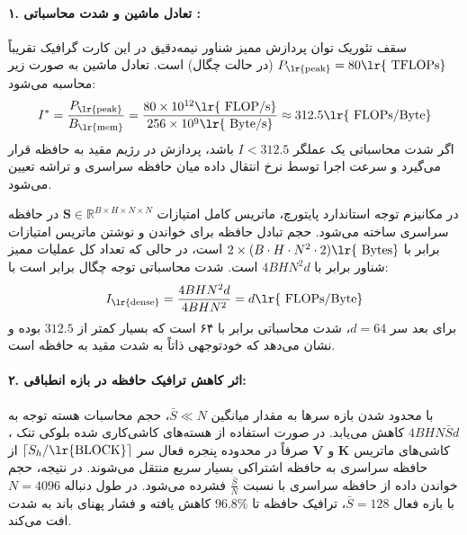\paragraph{۱. تعادل ماشین و شدت محاسباتی :}
سقف تئوریک توان پردازش ممیز شناور نیمه‌دقیق  در این کارت گرافیک تقریباً $P_{\text{\lr{peak}}} = 80\text{\lr{ TFLOPs}}$ (در حالت چگال) است. تعادل ماشین  به صورت زیر محاسبه می‌شود:
\begin{equation}
I^* = \frac{P_{\text{\lr{peak}}}}{B_{\text{\lr{mem}}}} = \frac{80 \times 10^{12}\text{\lr{ FLOP/s}}}{256 \times 10^9\text{\lr{ Byte/s}}} \approx 312.5\text{\lr{ FLOPs/Byte}}
\end{equation}
اگر شدت محاسباتی یک عملگر $I < 312.5$ باشد، پردازش در رژیم مقید به حافظه  قرار می‌گیرد و سرعت اجرا توسط نرخ انتقال داده میان حافظه سراسری  و تراشه تعیین می‌شود.

در مکانیزم توجه استاندارد پایتورچ، ماتریس کامل امتیازات $\mathbf{S} \in \mathbb{R}^{B \times H \times N \times N}$ در حافظه سراسری ساخته می‌شود. حجم تبادل حافظه برای خواندن و نوشتن ماتریس امتیازات برابر با $2 \times (B \cdot H \cdot N^2 \cdot 2)\text{\lr{ Bytes}}$ است، در حالی که تعداد کل عملیات ممیز شناور برابر با $4 B H N^2 d$ است. شدت محاسباتی توجه چگال برابر است با:
\begin{equation}
I_{\text{\lr{dense}}} = \frac{4 B H N^2 d}{4 B H N^2} = d\text{\lr{ FLOPs/Byte}}
\end{equation}
برای بعد سر $d = 64$، شدت محاسباتی برابر با ۶۴ است که بسیار کمتر از $312.5$ بوده و نشان می‌دهد که خودتوجهی ذاتاً به شدت مقید به حافظه است.

\paragraph{۲. اثر کاهش ترافیک حافظه در بازه انطباقی:}
با محدود شدن بازه سرها به مقدار میانگین $\bar{S} \ll N$، حجم محاسبات هسته توجه به $4 B H N \bar{S} d$ کاهش می‌یابد. در صورت استفاده از هسته‌های کاشی‌کاری شده بلوکی تنک ، کاشی‌های ماتریس $\mathbf{K}$ و $\mathbf{V}$ صرفاً در محدوده پنجره فعال سر $\lceil S_h / \text{\lr{BLOCK}} \rceil$ از حافظه سراسری به حافظه اشتراکی بسیار سریع  منتقل می‌شوند. در نتیجه، حجم خواندن داده از حافظه سراسری با نسبت $\frac{\bar{S}}{N}$ فشرده می‌شود. در طول دنباله $N = 4096$ با بازه فعال $\bar{S} = 128$، ترافیک حافظه تا $96.8\%$ کاهش یافته و فشار پهنای باند به شدت افت می‌کند.

